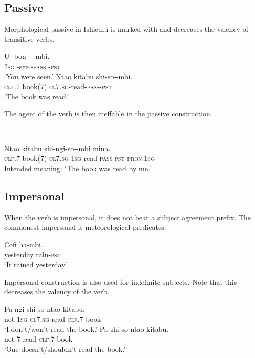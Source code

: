 \subsection{Passive}

Morphological passive in Ishiculu is marked with \textit{} and decreases the valency of transitive verbs.

\begin{exe}
\ex
\gll U {-bon\textramshorns} -\textit{} -mbi. \\
\textsc{2sg} -see -\textsc{pass} -\textsc{pst}  \\
\trans `You were seen.'
\ex
\gll Nta\textbeltl o kitabu shi-so-\textit{}-mbi. \\
\textsc{clf}.7 book(7) \textsc{cl7.sg}-read-\textsc{pass}-\textsc{pst}  \\
\trans `The book was read.'
\end{exe}

The agent of the verb is then ineffable in the passive construction.

\ 
\\

\begin{exe}
\ex
\gll * Nta\textbeltl o kitabu shi-ngi-so--mbi mina. \\
{} \textsc{clf}.7 book(7) \textsc{cl7.sg}-\textsc{1sg}-read-\textsc{pass}-\textsc{pst} \textsc{pron.1sg} \\
\trans Intended meaning: `The book was read by me.'
\end{exe}

\subsection{Impersonal}
When the verb is impersonal, it does not bear a subject agreement prefix. The commonest impersonal is meteorological predicates.

\begin{exe}
\ex
\gll Cofi ha-mbi. \\
yesterday rain-\textsc{pst} \\
\trans `It rained yesterday.'
\end{exe}

Impersonal construction is also used for indefinite subjects. Note that this decreases the valency of the verb.

\begin{exe}
\ex
\begin{xlist}
\ex
\gll Pa ngi-shi-so nta\textbeltl o kitabu. \\
not \textsc{1sg}-\textsc{cl7.sg}-read \textsc{clf}.7 book \\
\trans `I don't/won't read the book.'
\ex
\gll Pa shi-so nta\textbeltl o kitabu. \\
not \textsc{7}-read \textsc{clf}.7 book \\
\trans `One doesn't/shouldn't read the book.'
\end{xlist}
\end{exe}


